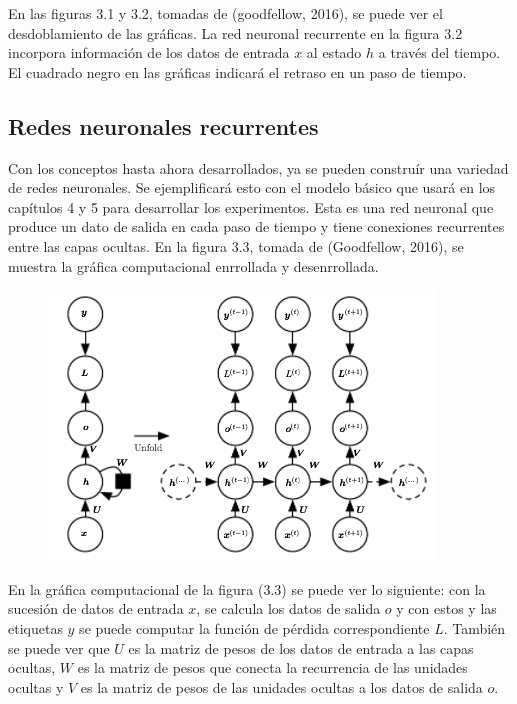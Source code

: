 En las figuras 3.1 y 3.2, tomadas de (goodfellow, 2016), se puede ver el desdoblamiento de las gráficas. La red neuronal recurrente en la figura $3.2$ incorpora información de los datos de entrada $x$ al estado $h$ a través del tiempo. El cuadrado negro en las gráficas indicará el retraso en un paso de tiempo.
\cite{goodfellow-et-al-2016}

\subsection{Redes neuronales recurrentes}
Con los conceptos hasta ahora desarrollados, ya se pueden construír una variedad de redes neuronales. Se ejemplificará esto con el modelo básico que usará en los capítulos 4 y 5 para desarrollar los experimentos. Esta es una red neuronal que produce un dato de salida en cada paso de tiempo y tiene conexiones recurrentes entre las capas ocultas. En la figura 3.3, tomada de (Goodfellow, 2016), se muestra la gráfica computacional enrrollada y desenrrollada.
\cite{goodfellow-et-al-2016}

\begin{figure}[h]
\begin{center}
\includegraphics{./imag/unfold3.png}
\end{center}
\caption{}
\end{figure}

En la gráfica computacional de la figura (3.3) se puede ver lo siguiente: con la sucesión de datos de entrada $x$, se calcula los datos de salida $o$ y con estos y las etiquetas $y$ se puede computar la función de pérdida correspondiente $L$. También se puede ver que $U$ es la matriz de pesos de los datos de entrada a las capas ocultas, $W$ es la matriz de pesos que conecta la recurrencia de las unidades ocultas y $V$ es la matriz de pesos de las unidades ocultas a los datos de salida $o$.

